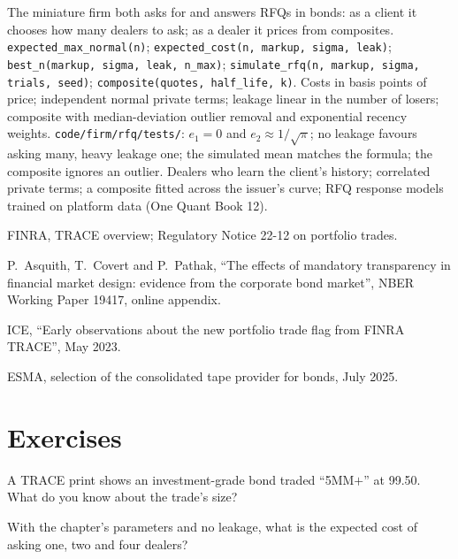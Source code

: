 \begin{build}
 The miniature firm both asks for and answers RFQs in bonds: as a
client it chooses how many dealers to ask; as a dealer it prices from composites.
 \texttt{expected\_max\_normal(n)}; \texttt{expected\_cost(n, markup,
sigma, leak)}; \texttt{best\_n(markup, sigma, leak, n\_max)};
\texttt{simulate\_rfq(n, markup, sigma, trials, seed)}; \texttt{composite(quotes,
half\_life, k)}.
 Costs in basis points of price; independent normal private terms;
leakage linear in the number of losers; composite with median-deviation outlier
removal and exponential recency weights.
 \texttt{code/firm/rfq/tests/}: $e_1 = 0$ and $e_2 \approx
1/\sqrt\pi$; no leakage favours asking many, heavy leakage one; the simulated mean
matches the formula; the composite ignores an outlier.
 Dealers who learn the client's history; correlated private terms;
a composite fitted across the issuer's curve; RFQ response models trained on
platform data (One Quant Book 12).
\end{build}

\begin{omsources}
\item FINRA, TRACE overview; Regulatory Notice 22-12 on portfolio trades.
\item P.~Asquith, T.~Covert and P.~Pathak, ``The effects of mandatory transparency in
financial market design: evidence from the corporate bond market'', NBER Working
Paper 19417, online appendix.
\item ICE, ``Early observations about the new portfolio trade flag from FINRA TRACE'',
May 2023.
\item ESMA, selection of the consolidated tape provider for bonds, July 2025.
\end{omsources}

\section{Exercises}

\begin{exercise}[$\star$]\label{exo:m2:how-bonds-trade:1}
A TRACE print shows an investment-grade bond traded ``5MM$+$'' at 99.50. What do you
know about the trade's size?
\end{exercise}

\begin{exercise}[$\star$]\label{exo:m2:how-bonds-trade:2}
With the chapter's parameters and no leakage, what is the expected cost of asking one,
two and four dealers?
\end{exercise}

